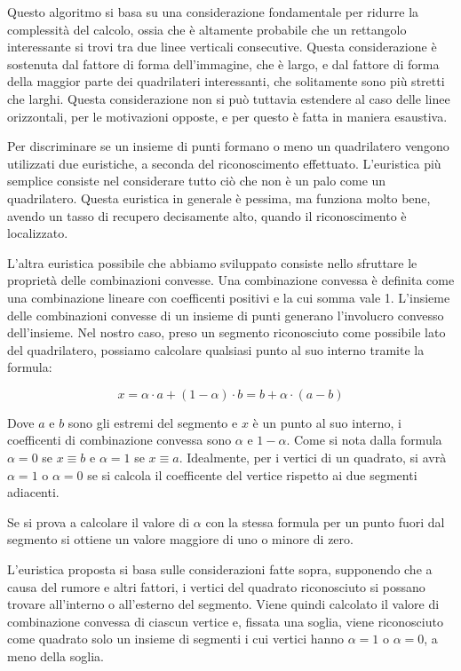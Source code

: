 Questo algoritmo si basa su una considerazione fondamentale per ridurre la complessità del calcolo, ossia che è altamente probabile che un rettangolo interessante si trovi tra due linee verticali consecutive. Questa considerazione è sostenuta dal fattore di forma dell'immagine, che è largo, e dal fattore di forma della maggior parte dei quadrilateri interessanti, che solitamente sono più stretti che larghi. Questa considerazione non si può tuttavia estendere al caso delle linee orizzontali, per le motivazioni opposte, e per questo è fatta in maniera esaustiva.


Per discriminare se un insieme di punti formano o meno un quadrilatero vengono utilizzati due euristiche, a seconda del riconoscimento effettuato.
L'euristica più semplice consiste nel considerare tutto ciò che non è un palo come un quadrilatero. Questa euristica in generale è pessima, ma funziona molto bene, avendo un tasso di recupero decisamente alto, quando il riconoscimento è localizzato.

L'altra euristica possibile che abbiamo sviluppato consiste nello sfruttare le proprietà delle combinazioni convesse. Una combinazione convessa è definita come una combinazione lineare con coefficenti positivi e la cui somma vale 1. L'insieme delle combinazioni convesse di un insieme di punti generano l'involucro convesso dell'insieme.
Nel nostro caso, preso un segmento riconosciuto come possibile lato del quadrilatero, possiamo calcolare qualsiasi punto al suo interno tramite la formula:

\begin{equation}
  x = \alpha\cdot a + (1 - \alpha)\cdot b = b + \alpha\cdot(a - b)
\end{equation}

Dove $a$ e $b$ sono gli estremi del segmento e $x$ è un punto al suo interno, i coefficenti di combinazione convessa sono $\alpha$ e $1 - \alpha$.
Come si nota dalla formula $\alpha = 0$ se $x \equiv b$ e $\alpha = 1$ se $x \equiv a$.
Idealmente, per i vertici di un quadrato, si avrà $\alpha=1$ o $\alpha=0$ se si calcola il coefficente del vertice rispetto ai due segmenti adiacenti.

Se si prova a calcolare il valore di $\alpha$ con la stessa formula per un punto fuori dal segmento si ottiene un valore maggiore di uno o minore di zero.

L'euristica proposta si basa sulle considerazioni fatte sopra, supponendo che a causa del rumore e altri fattori, i vertici del quadrato riconosciuto si possano trovare all'interno o all'esterno del segmento. Viene quindi calcolato il valore di combinazione convessa di ciascun vertice e, fissata una soglia, viene riconosciuto come quadrato solo un insieme di segmenti i cui vertici hanno $\alpha=1$ o $\alpha=0$, a meno della soglia.


